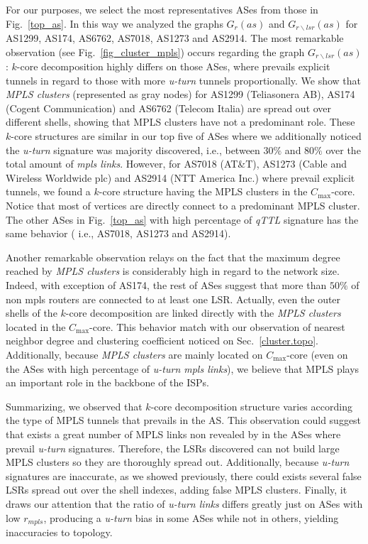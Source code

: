 For our purposes, we select the most representatives ASes from those in
Fig.~\ref{top_as}. In this way we analyzed the graphs $G_{r}(as)$ and
$G_{r\backslash lsr}(as)$ for AS1299, AS174, AS6762, AS7018, AS1273 and AS2914.
The most remarkable observation (see Fig.~\ref{fig_cluster_mpls}) occurs
regarding the graph $G_{r\backslash lsr}(as)$: $k$-core decomposition highly
differs on those ASes, where prevails explicit tunnels in regard to those with
more \textit{u-turn} tunnels proportionally. We show that \textit{MPLS clusters}
(represented as gray nodes) for  AS1299 (Teliasonera AB), AS174 (Cogent
Communication) and AS6762 (Telecom Italia) are spread out over different shells, showing that MPLS clusters have not a predominant role.
These $k$-core structures are similar in our top five of ASes where we
additionally noticed  the \textit{u-turn} signature was majority discovered,
i.e., between $30\%$ and  $80\%$ over  the total amount of \textit{mpls links}.
However, for AS7018 (AT\&T), AS1273 (Cable and Wireless Worldwide plc) and
AS2914 (NTT America Inc.)  where prevail explicit tunnels, we found a $k$-core
structure having the MPLS clusters in the $C_{\max}$-core. 
Notice that most of vertices are directly connect to a predominant MPLS cluster.
The other ASes in Fig.~\ref{top_as} with high percentage of \textit{qTTL} signature has the same behavior ( i.e., AS7018, AS1273 and
AS2914).


Another remarkable observation  relays on the fact that the maximum degree
reached by \textit{MPLS clusters} is considerably high in regard to the network
size. Indeed, with exception of AS174, the rest of ASes suggest that more than
$50\%$ of non mpls routers are connected  to at least one LSR. Actually, even
the outer shells of the $k$-core decomposition are linked directly with the
\textit{MPLS clusters} located in the $C_{\max}$-core. This behavior match with
our observation of nearest neighbor degree and clustering coefficient noticed on
Sec.~\ref{cluster.topo}. Additionally, because \textit{MPLS clusters} are
mainly located on $C_{\max}$-core (even on the ASes with high percentage of
\textit{u-turn mpls links}), we believe that MPLS plays an important role in the
backbone of the ISPs.

Summarizing, we observed that  $k$-core decomposition structure varies according
the type of MPLS tunnels that prevails in the AS. This observation could suggest
that exists a great number of MPLS links non revealed by \traceroute in the ASes
where prevail \textit{u-turn} signatures. Therefore, the LSRs discovered can not
build large MPLS clusters so they are thoroughly spread out.
Additionally, because \textit{u-turn} signatures are inaccurate, as we showed
previously, there could exists several false LSRs spread out over the shell
indexes, adding false MPLS clusters. Finally, it draws our attention
that the ratio of \textit{u-turn links} differs greatly just on ASes with low
$r_{mpls}$, producing a \textit{u-turn} bias in some ASes while not in others,
yielding inaccuracies to topology.



